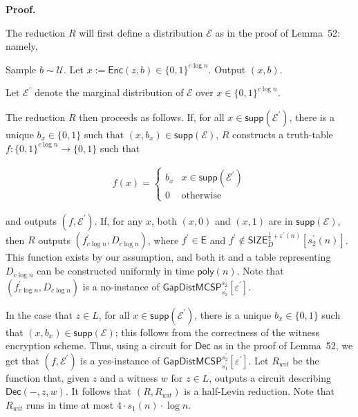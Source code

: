 \documentclass[10pt,a4paper]{article}
\begin{document}



\par\medskip\noindent\textbf{Proof.}\par




The reduction $R$ will first define a distribution $\mathcal{E}$ as in the proof of Lemma 52: namely,\par



Sample $b\sim\mathcal{U}$. Let $x:={\mathsf{Enc}}(z,b)\in\{0,1\}^{c\log n}$. Output $(x,b)$.\par



Let $\mathcal{E}^{\prime}$ denote the marginal distribution of $\mathcal{E}$ over $x\in\{0,1\}^{c\log n}$.\par




The reduction $R$ then proceeds as follows. If, for all $x\in{\mathsf{supp}}(\mathcal{E}^{\prime})$, there is a unique $b_{x}\in\{0,1\}$ such that $(x,b_{x})\in{\mathsf{supp}}(\mathcal{E})$, $R$ constructs a truth-table $f:\{0,1\}^{c\log n}\to\{0,1\}$ such that\par


\[\begin{gathered}
f(x)=\begin{cases}b_{x}&x\in{\mathsf{supp}}(\mathcal{E}^{\prime})\\
0&\text{otherwise}\end{cases}
\end{gathered}\]


and outputs $(f,\mathcal{E}^{\prime})$. If, for any $x$, both $(x,0)$ and $(x,1)$ are in ${\mathsf{supp}}(\mathcal{E})$, then $R$ outputs $(f^{\prime}_{c\log n},D_{c\log n})$, where $f^{\prime}\in{\mathsf{E}}$ and $f^{\prime}\notin{\mathsf{SIZE}}_{D}^{\frac{1}{2}+\varepsilon^{\prime}(n)}[s_{2}^{\prime}(n)]$. This function exists by our assumption, and both it and a table representing $D_{c\log n}$ can be constructed uniformly in time ${\mathsf{poly}}(n)$. Note that $(f_{c\log n}^{\prime},D_{c\log n})$ is a no-instance of ${\mathsf{GapDistMCSP}}_{s_{1}^{\prime}}^{s_{2}^{\prime}}[\varepsilon^{\prime}]$.\par




In the case that $z\in L$, for all $x\in{\mathsf{supp}}(\mathcal{E}^{\prime})$, there is a unique $b_{x}\in\{0,1\}$ such that $(x,b_{x})\in{\mathsf{supp}}(\mathcal{E})$; this follows from the correctness of the witness encryption scheme. Thus, using a circuit for ${\mathsf{Dec}}$ as in the proof of Lemma 52, we get that $(f,\mathcal{E}^{\prime})$ is a yes-instance of ${\mathsf{GapDistMCSP}}_{s_{1}^{\prime}}^{s_{2}^{\prime}}[\varepsilon^{\prime}]$. Let $R_{wit}$ be the function that, given $z$ and a witness $w$ for $z\in L$, outputs a circuit describing ${\mathsf{Dec}}(-,z,w)$. It follows that $(R,R_{wit})$ is a half-Levin reduction. Note that $R_{wit}$ runs in time at most $4\cdot s_{1}(n)\cdot\log n$.\par
\end{document}
